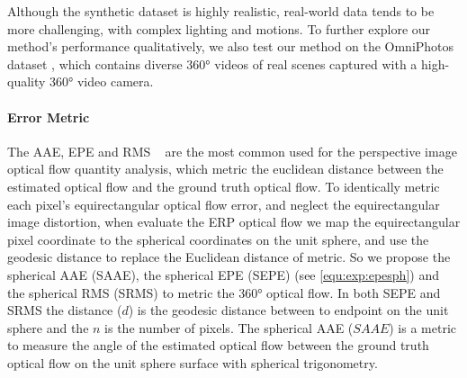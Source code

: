 Although the synthetic dataset is highly realistic, real-world data tends to be more challenging, with complex lighting and motions.
%
To further explore our method's performance qualitatively, we also test our method on the OmniPhotos dataset \cite{BerteYLR2020}, which contains diverse 360° videos of real scenes captured with a high-quality 360° video camera.


\paragraph{Error Metric}
%
The AAE, EPE and RMS ~\cite{BakerSLRBS2011} are the most common used for the perspective image optical flow quantity analysis, which metric the euclidean distance between the estimated optical flow and the ground truth optical flow.
To identically metric each pixel's equirectangular optical flow error, and neglect the equirectangular image distortion, when evaluate the ERP optical flow we map the equirectangular pixel coordinate to the spherical coordinates on the unit sphere, and use the geodesic distance to replace the Euclidean distance of metric. 
%
So we propose the spherical AAE (SAAE), the spherical EPE (SEPE) (see \cref{equ:exp:epesph}) and the spherical RMS (SRMS) to metric the 360° optical flow.
In both SEPE and SRMS the distance ($d$) is the geodesic distance between to endpoint on the unit sphere and the $n$ is the number of pixels.
The spherical AAE ($SAAE$) is a metric to measure the angle of the estimated optical flow between the ground truth optical flow on the unit sphere surface with spherical trigonometry.

